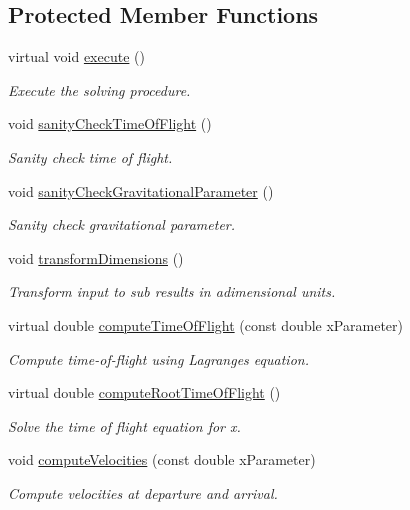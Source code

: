 \subsection*{Protected Member Functions}
\begin{DoxyCompactItemize}
\item 
virtual void \hyperlink{classtudat_1_1mission__segments_1_1ZeroRevolutionLambertTargeterIzzo_a1cb96dd1627e781c996d38b9303a57df}{execute} ()
\begin{DoxyCompactList}\small\item\em Execute the solving procedure. \end{DoxyCompactList}\item 
void \hyperlink{classtudat_1_1mission__segments_1_1ZeroRevolutionLambertTargeterIzzo_a16e6bfdeadb36d16cf55f08b5ed25727}{sanity\+Check\+Time\+Of\+Flight} ()
\begin{DoxyCompactList}\small\item\em Sanity check time of flight. \end{DoxyCompactList}\item 
void \hyperlink{classtudat_1_1mission__segments_1_1ZeroRevolutionLambertTargeterIzzo_a896eb162d193d0112ee40bd367b47d09}{sanity\+Check\+Gravitational\+Parameter} ()
\begin{DoxyCompactList}\small\item\em Sanity check gravitational parameter. \end{DoxyCompactList}\item 
void \hyperlink{classtudat_1_1mission__segments_1_1ZeroRevolutionLambertTargeterIzzo_a0b9fc55e3bf9ddb1ffbc51c7202f1cda}{transform\+Dimensions} ()
\begin{DoxyCompactList}\small\item\em Transform input to sub results in adimensional units. \end{DoxyCompactList}\item 
virtual double \hyperlink{classtudat_1_1mission__segments_1_1ZeroRevolutionLambertTargeterIzzo_a580304bcf54f4024c3ccf191ca5d2633}{compute\+Time\+Of\+Flight} (const double x\+Parameter)
\begin{DoxyCompactList}\small\item\em Compute time-\/of-\/flight using Lagrange\textquotesingle{}s equation. \end{DoxyCompactList}\item 
virtual double \hyperlink{classtudat_1_1mission__segments_1_1ZeroRevolutionLambertTargeterIzzo_a98925d977adff13d26b20caf4a1faa49}{compute\+Root\+Time\+Of\+Flight} ()
\begin{DoxyCompactList}\small\item\em Solve the time of flight equation for x. \end{DoxyCompactList}\item 
void \hyperlink{classtudat_1_1mission__segments_1_1ZeroRevolutionLambertTargeterIzzo_a198b12eafe08a9a66900ee81fc215d20}{compute\+Velocities} (const double x\+Parameter)
\begin{DoxyCompactList}\small\item\em Compute velocities at departure and arrival. \end{DoxyCompactList}\end{DoxyCompactItemize}
